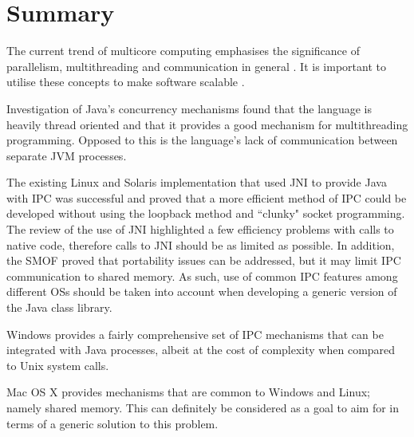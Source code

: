 \documentclass[12pt,a4paper,oneside]{article}
\begin{document}
\section{Summary}
\begin{spacing}{1.4}
The current trend of multicore computing emphasises the significance of parallelism, multithreading and communication in general \citep{taboada2013javaforHPC}. It is important to utilise these concepts to make software scalable \citep{SlinnJVMAkka}.

Investigation of Java's concurrency mechanisms found that the language is heavily thread oriented and that it provides a good mechanism for multithreading programming. Opposed to this is the language's lack of communication between separate JVM processes. 

The existing Linux and Solaris implementation that used JNI to provide Java with IPC was successful and proved that a more efficient method of IPC could be developed without using the loopback method and ``clunky" socket programming. The review of the use of JNI highlighted a few efficiency problems with calls to native code, therefore calls to JNI should be as limited as possible. In addition, the SMOF proved that portability issues can be addressed, but it may limit IPC communication to shared memory. As such, use of common IPC features among different OSs should be taken into account when developing a generic version of the Java class library.

Windows provides a fairly comprehensive set of IPC mechanisms that can be integrated with Java processes, albeit at the cost of complexity when compared to Unix system calls. 

Mac OS X provides mechanisms that are common to Windows and Linux; namely shared memory. This can definitely be considered as a goal to aim for in terms of a generic solution to this problem.
\end{spacing}
\pagebreak
  

  
\end{document}
